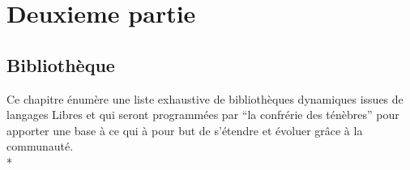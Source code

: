 \documentclass{report}
\begin{document}

\chapter{Deuxieme partie}

\section{Bibliothèque}

Ce chapitre énumère une liste exhaustive de bibliothèques dynamiques issues de langages Libres et qui seront programmées par \enquote{la confrérie des ténèbres} pour apporter une base à ce qui à pour but de s'étendre et évoluer grâce à la communauté.\\*
\end{document}
